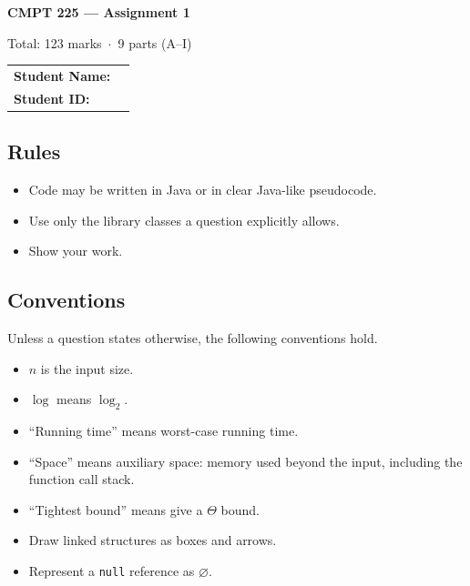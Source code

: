\documentclass[11pt]{article}
\newcommand{\code}[1]{\mbox{\texttt{#1}}}  %
\begin{document}
\thispagestyle{cover}
\begin{center}
  {\LARGE\bfseries CMPT 225 --- Assignment 1\par}
  \medskip
  {\large Total: 123 marks \,$\cdot$\, 9 parts (A--I)\par}
\end{center}

\bigskip
\begin{tabular}{@{}l p{10cm}@{}}
  \textbf{Student Name:} & \hrulefill \\[16pt]
  \textbf{Student ID:}   & \hrulefill \\
\end{tabular}

\subsection*{Rules}
\begin{itemize}
  \item Code may be written in Java or in clear Java-like pseudocode.
  \item Use only the library classes a question explicitly allows.
  \item Show your work.
\end{itemize}

\subsection*{Conventions}
Unless a question states otherwise, the following conventions hold.
\begin{itemize}
  \item $n$ is the input size.
  \item $\log$ means $\log_2$.
  \item ``Running time'' means worst-case running time.
  \item ``Space'' means auxiliary space: memory used beyond the input,
        including the function call stack.
  \item ``Tightest bound'' means give a $\Theta$ bound.
  \item Draw linked structures as boxes and arrows.
  \item Represent a \code{null} reference as $\varnothing$.
\end{itemize}
\end{document}
